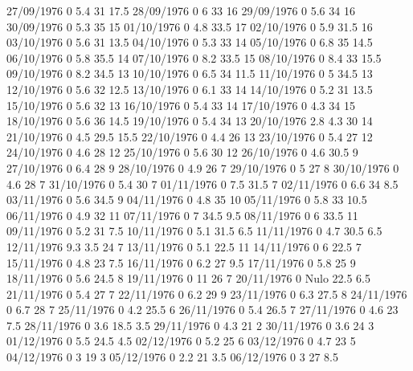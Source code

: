 27/09/1976  0      5.4    31     17.5 
28/09/1976  0      6      33     16 
29/09/1976  0      5.6    34     16 
30/09/1976  0      5.3    35     15 
01/10/1976  0      4.8    33.5   17 
02/10/1976  0      5.9    31.5   16 
03/10/1976  0      5.6    31     13.5 
04/10/1976  0      5.3    33     14 
05/10/1976  0      6.8    35     14.5 
06/10/1976  0      5.8    35.5   14 
07/10/1976  0      8.2    33.5   15 
08/10/1976  0      8.4    33     15.5 
09/10/1976  0      8.2    34.5   13 
10/10/1976  0      6.5    34     11.5 
11/10/1976  0      5      34.5   13 
12/10/1976  0      5.6    32     12.5 
13/10/1976  0      6.1    33     14 
14/10/1976  0      5.2    31     13.5 
15/10/1976  0      5.6    32     13 
16/10/1976  0      5.4    33     14 
17/10/1976  0      4.3    34     15 
18/10/1976  0      5.6    36     14.5 
19/10/1976  0      5.4    34     13 
20/10/1976  2.8    4.3    30     14 
21/10/1976  0      4.5    29.5   15.5 
22/10/1976  0      4.4    26     13 
23/10/1976  0      5.4    27     12 
24/10/1976  0      4.6    28     12 
25/10/1976  0      5.6    30     12 
26/10/1976  0      4.6    30.5   9 
27/10/1976  0      6.4    28     9 
28/10/1976  0      4.9    26     7 
29/10/1976  0      5      27     8 
30/10/1976  0      4.6    28     7 
31/10/1976  0      5.4    30     7 
01/11/1976  0      7.5    31.5   7 
02/11/1976  0      6.6    34     8.5 
03/11/1976  0      5.6    34.5   9 
04/11/1976  0      4.8    35     10 
05/11/1976  0      5.8    33     10.5 
06/11/1976  0      4.9    32     11 
07/11/1976  0      7      34.5   9.5 
08/11/1976  0      6      33.5   11 
09/11/1976  0      5.2    31     7.5 
10/11/1976  0      5.1    31.5   6.5 
11/11/1976  0      4.7    30.5   6.5 
12/11/1976  9.3    3.5    24     7 
13/11/1976  0      5.1    22.5   11 
14/11/1976  0      6      22.5   7 
15/11/1976  0      4.8    23     7.5 
16/11/1976  0      6.2    27     9.5 
17/11/1976  0      5.8    25     9 
18/11/1976  0      5.6    24.5   8 
19/11/1976  0      11     26     7 
20/11/1976  0     Nulo    22.5   6.5 
21/11/1976  0      5.4    27     7 
22/11/1976  0      6.2    29     9 
23/11/1976  0      6.3    27.5   8 
24/11/1976  0      6.7    28     7 
25/11/1976  0      4.2    25.5   6 
26/11/1976  0      5.4    26.5   7 
27/11/1976  0      4.6    23     7.5 
28/11/1976  0      3.6    18.5   3.5 
29/11/1976  0      4.3    21     2 
30/11/1976  0      3.6    24     3 
01/12/1976  0      5.5    24.5   4.5 
02/12/1976  0      5.2    25     6 
03/12/1976  0      4.7    23     5 
04/12/1976  0      3      19     3 
05/12/1976  0      2.2    21     3.5 
06/12/1976  0      3      27     8.5 
